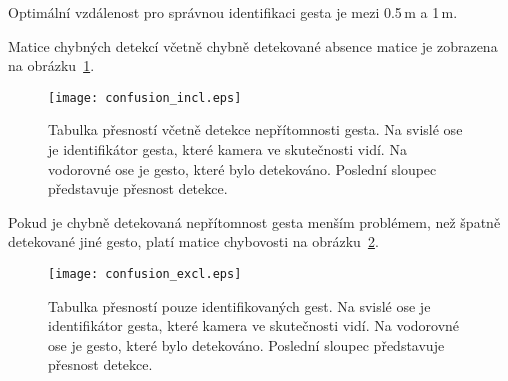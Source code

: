 Optimální vzdálenost pro správnou identifikaci gesta je mezi 0.5\,m a 1\,m.

Matice chybných detekcí včetně chybně detekované absence matice je zobrazena na obrázku~\ref{pic21}.
\begin{figure}[h]
\centering
\texttt{[image: confusion\_incl.eps]}
\caption{Tabulka přesností včetně detekce nepřítomnosti gesta. Na svislé ose je identifikátor gesta, které kamera ve skutečnosti vidí. Na vodorovné ose je gesto, které bylo detekováno. Poslední sloupec představuje přesnost detekce. }
\label{pic21}
\end{figure}

Pokud je chybně detekovaná nepřítomnost gesta menším problémem, než špatně detekované jiné gesto, platí matice chybovosti na obrázku~\ref{pic22}.
\begin{figure}[htp]
\centering
\texttt{[image: confusion\_excl.eps]}
\caption{Tabulka přesností pouze identifikovaných gest. Na svislé ose je identifikátor gesta, které kamera ve skutečnosti vidí. Na vodorovné ose je gesto, které bylo detekováno. Poslední sloupec představuje přesnost detekce.}
\label{pic22}
\end{figure}





\endinput
